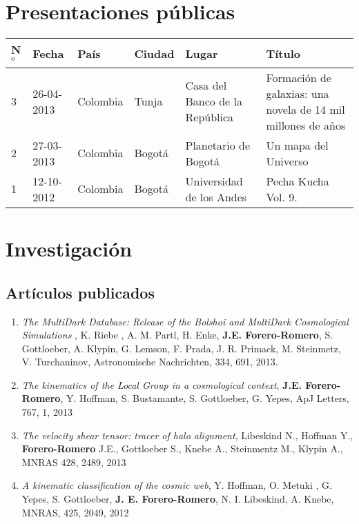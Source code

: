 \documentclass{article}
\begin{document}
\section*{Presentaciones p\'ublicas}

\begin{tabular}{lp{2.0cm} p{1.2cm} p{1.5cm} p{2cm} p{5cm}}\hline
N$^{o}$ & Fecha & Pa\'is & Ciudad & Lugar & T\'itulo\\\hline
3 & 26-04-2013 & Colombia & Tunja & Casa del Banco de la Rep\'ublica &
Formaci\'on de galaxias: una novela de 14 mil millones de a\~nos\\  
2 & 27-03-2013 & Colombia & Bogot\'a & Planetario de Bogot\'a & Un mapa del
Universo\\
1 & 12-10-2012 & Colombia & Bogot\'a & Universidad de los Andes & Pecha
Kucha Vol. 9.\\ \hline
\end{tabular}

\section*{Investigaci\'on}

\subsection*{Art\'iculos publicados}

\begin{enumerate}
\item {\it The MultiDark Database: Release of the Bolshoi and MultiDark Cosmological Simulations} , K. Riebe , A. M. Partl, H. Enke, {\bf J.E. Forero-Romero}, S. Gottloeber, A. Klypin, G. Lemson, F. Prada, J. R. Primack, M. Steinmetz, V. Turchaninov, Astronomische Nachrichten, 334, 691, 2013.

\item {\it The kinematics of the Local Group in a cosmological context}, 
{\bf J.E. Forero-Romero}, Y. Hoffman, S. Bustamante, S. Gottloeber, G. Yepes, ApJ Letters, 767, 1, 2013

\item {\it The velocity shear tensor: tracer of halo alignment}, Libeskind N., Hoffman Y., {\bf Forero-Romero} J.E., Gottloeber S., Knebe A., Steinmentz M., Klypin A., MNRAS 428, 2489, 2013

\item {\it A kinematic classification of the cosmic web}, Y. Hoffman, O. Metuki , G. Yepes, S. Gottloeber, {\bf J. E. Forero-Romero}, N. I. Libeskind, A. Knebe, MNRAS, 425, 2049, 2012
\end{enumerate}
\end{document}

